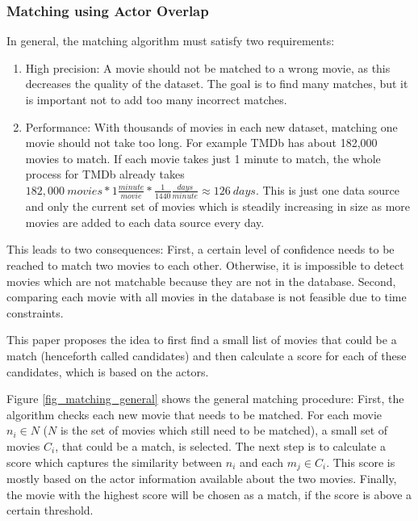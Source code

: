 \subsubsection{Matching using Actor Overlap}
In general, the matching algorithm must satisfy two requirements:
\begin{enumerate}
	\item{High precision:} A movie should not be matched to a wrong movie, as this decreases the quality of the dataset.
	The goal is to find many matches, but it is important not to add too many incorrect matches.
	\item{Performance:} With thousands of movies in each new dataset, matching one movie should not take too long.
	For example TMDb has about 182,000 movies to match.
	If each movie takes just 1 minute to match, the whole process for TMDb already takes $182,000~movies * 1 \frac{minute}{movie} * \frac{1}{1440} \frac{days}{minute} \approx 126~days$.
	This is just one data source and only the current set of movies which is steadily increasing in size as more movies are added to each data source every day.
\end{enumerate}

This leads to two consequences: First, a certain level of confidence needs to be reached to match two movies to each other.
Otherwise, it is impossible to detect movies which are not matchable because they are not in the database.
Second, comparing each movie with all movies in the database is not feasible due to time constraints.

This paper proposes the idea to first find a small list of movies that could be a match (henceforth called candidates) and then calculate a score for each of these candidates, which is based on the actors.

Figure \ref{fig_matching_general} shows the general matching procedure:
First, the algorithm checks each new movie that needs to be matched.
For each movie $n_i \in N$ ($N$ is the set of movies which still need to be matched), a small set of movies $C_{i}$, that could be a match, is selected.
The next step is to calculate a score which captures the similarity between $n_i$ and each $m_j \in C_i$.
This score is mostly based on the actor information available about the two movies.
Finally, the movie with the highest score will be chosen as a match, if the score is above a certain threshold.

